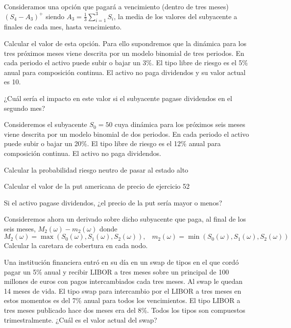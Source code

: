 \begin{problem}[1]
Consideramos una opción que pagará a vencimiento (dentro de tres meses) $(S_4-A_3)^+$ siendo $A_3=\frac{1}{3}\sum_{i=1}^3S_i$, la media de los valores del subyacente a finales de cada mes, hasta vencimiento.

\ppart Calcular el valor de esta opción. Para ello supondremos que la dinámica para los tres próximos meses viene descrita por un modelo binomial de tres periodos. En cada periodo el activo puede subir o bajar un 3\%. El tipo libre de riesgo es el 5\% anual para composición continua. El activo no paga dividendos y su valor actual es 10.

\ppart ¿Cuál sería el impacto en este valor si el subyacente pagase dividendos en el segundo mes?

\solution




\end{problem}

\begin{problem}[2]
Consideremos el subyacente $S_0=50$ cuya dinámica para los próximos seis meses viene descrita por un modelo binomial de dos periodos. En cada periodo el activo puede subir o bajar un 20\%. El tipo libre de riesgo es el 12\% anual para composición continua. El activo no paga dividendos.

\ppart Calcular la probabilidad riesgo neutro de pasar al estado alto

\ppart Calcular el valor de la put americana de precio de ejercicio 52

\ppart Si el activo pagase dividendos, ¿el precio de la put sería mayor o menos?

\ppart Consideremos ahora un derivado sobre dicho subyacente que paga, al final de los seis meses, $M_2(ω)-m_2(ω)$ donde
\[M_2(ω)=\max(S_0(ω),S_1(ω),S_2(ω)), \;\;\; m_2(ω)=\min(S_0(ω),S_1(ω),S_2(ω))\]
Calcular la caretara de cobertura en cada nodo.

\solution

\end{problem}

\begin{problem}[3]
Una institución financiera entró en su día en un swap de tipos en el que cordó pagar un 5\% anual y recibir LIBOR a tres meses sobre un principal de 100 millones de euros con pagos intercambiados cada tres meses. Al swap le quedan 14 meses de vida. El tipo swap para intercambio por el LIBOR a tres meses en estos momentos es del 7\% anual para todos los vencimientos. El tipo LIBOR a tres meses publicado hace dos meses era del 8\%. Todos los tipos son compuestos trimestralmente. ¿Cuál es el valor actual del swap?

\solution

\end{problem}

